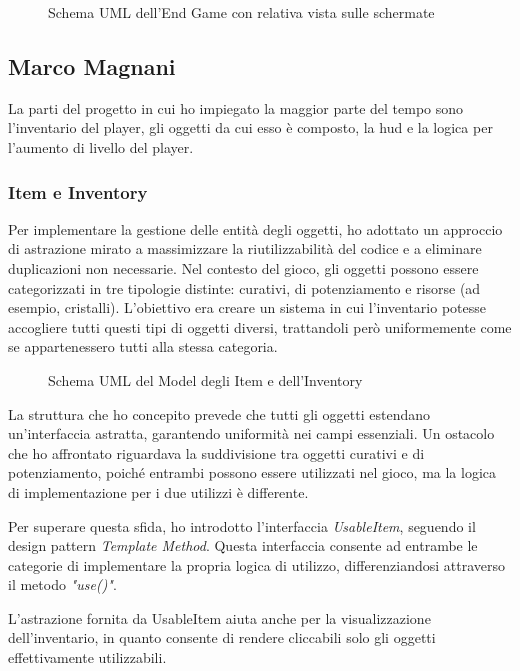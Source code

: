 \documentclass[a4paper,12pt]{report}
\begin{document}
\begin{figure}[H]
	\centering
	
	\caption{Schema UML dell'End Game con relativa vista sulle schermate}
	\label{fig:the-exiled-victory_gameover-uml}
\end{figure}

\subsection{Marco Magnani}
La parti del progetto in cui ho impiegato la maggior parte del tempo sono l'inventario del player, gli oggetti da cui esso è composto, la hud e la logica per l'aumento di livello del player.

\subsubsection{Item e Inventory}

Per implementare la gestione delle entità degli oggetti, ho adottato un approccio di astrazione mirato a massimizzare la riutilizzabilità del codice e a eliminare duplicazioni non necessarie. Nel contesto del gioco, gli oggetti possono essere categorizzati in tre tipologie distinte: curativi, di potenziamento e risorse (ad esempio, cristalli).
L'obiettivo era creare un sistema in cui l'inventario potesse accogliere tutti questi tipi di oggetti diversi, trattandoli però uniformemente come se appartenessero tutti alla stessa categoria.
\begin{figure}[H]
	\centering
	
	\caption{Schema UML del Model degli Item e dell'Inventory}
	\label{fig:the-exiled-item-uml}
\end{figure}

La struttura che ho concepito prevede che tutti gli oggetti estendano un'interfaccia astratta, garantendo uniformità nei campi essenziali. Un ostacolo che ho affrontato riguardava la suddivisione tra oggetti curativi e di potenziamento, poiché entrambi possono essere utilizzati nel gioco, ma la logica di implementazione per i due utilizzi è differente.

Per superare questa sfida, ho introdotto l'interfaccia \textit{UsableItem}, seguendo il design pattern \textit{Template Method}. Questa interfaccia consente ad entrambe le categorie di implementare la propria logica di utilizzo, differenziandosi attraverso il metodo \textit{"use()"}.

L'astrazione fornita da UsableItem aiuta anche per la visualizzazione dell'inventario, in quanto consente di rendere cliccabili solo gli oggetti effettivamente utilizzabili.
\end{document}

